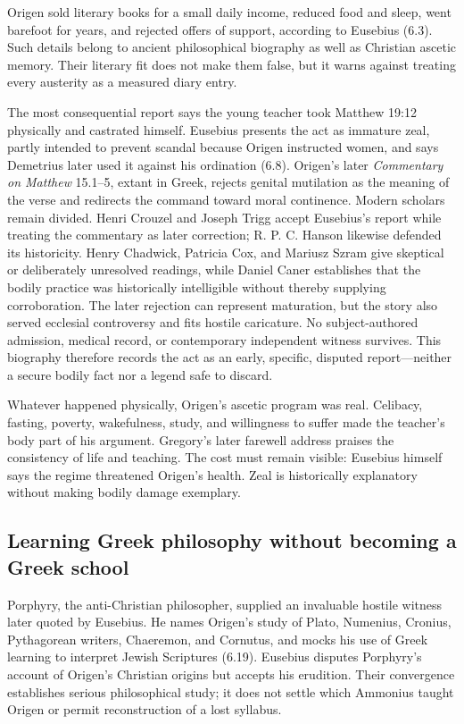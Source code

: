 Origen sold literary books for a small daily income, reduced food and sleep,
went barefoot for years, and rejected offers of support, according to Eusebius
(6.3). Such details belong to ancient philosophical biography as well as
Christian ascetic memory. Their literary fit does not make them false, but it
warns against treating every austerity as a measured diary entry.

The most consequential report says the young teacher took Matthew 19:12
physically and castrated himself. Eusebius presents the act as immature zeal,
partly intended to prevent scandal because Origen instructed women, and says
Demetrius later used it against his ordination (6.8). Origen's later
\emph{Commentary on Matthew} 15.1--5, extant in Greek, rejects genital
mutilation as the meaning of the verse and redirects the command toward moral
continence. Modern scholars remain divided. Henri Crouzel and Joseph Trigg
accept Eusebius's report while treating the commentary as later correction;
R. P. C. Hanson likewise defended its historicity. Henry Chadwick, Patricia
Cox, and Mariusz Szram give skeptical or deliberately unresolved readings,
while Daniel Caner establishes that the bodily practice was historically
intelligible without thereby supplying corroboration. The later rejection can
represent maturation, but the story also served ecclesial controversy and fits
hostile caricature.
No subject-authored admission, medical record, or contemporary independent
witness survives. This biography therefore records the act as an early,
specific, disputed report---neither a secure bodily fact nor a legend safe to
discard.

Whatever happened physically, Origen's ascetic program was real. Celibacy,
fasting, poverty, wakefulness, study, and willingness to suffer made the
teacher's body part of his argument. Gregory's later farewell address praises
the consistency of life and teaching. The cost must remain visible: Eusebius
himself says the regime threatened Origen's health. Zeal is historically
explanatory without making bodily damage exemplary.

\subsection{Learning Greek philosophy without becoming a Greek school}

Porphyry, the anti-Christian philosopher, supplied an invaluable hostile
witness later quoted by Eusebius. He names Origen's study of Plato, Numenius,
Cronius, Pythagorean writers, Chaeremon, and Cornutus, and mocks his use of
Greek learning to interpret Jewish Scriptures (6.19). Eusebius disputes
Porphyry's account of Origen's Christian origins but accepts his erudition.
Their convergence establishes serious philosophical study; it does not settle
which Ammonius taught Origen or permit reconstruction of a lost syllabus.

